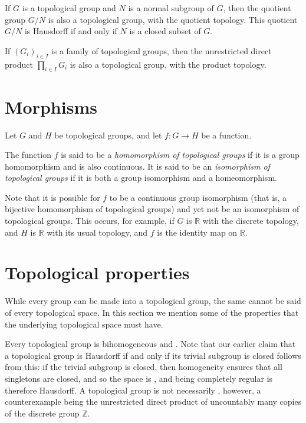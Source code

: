 \documentclass[12pt]{article}
\def\R{\mathbb{R}}
\def\Z{\mathbb{Z}}
\begin{document}
If $G$ is a topological group and $N$ is a normal subgroup of $G$,
then the quotient group $G/N$ is also a topological group,
with the quotient topology.
This quotient $G/N$ is Hausdorff if and only if $N$ is a closed subset of $G$.

If $(G_i)_{i\in I}$ is a family of topological groups,
then the unrestricted direct product $\prod_{i\in I}G_i$
is also a topological group, with the product topology.

\section*{Morphisms}

Let $G$ and $H$ be topological groups, and let $f\colon G\to H$ be a function.

The function $f$ is said to be a \emph{homomorphism of topological groups}
if it is a group homomorphism and is also continuous.
It is said to be an \emph{isomorphism of topological groups}
if it is both a group isomorphism and a homeomorphism.

Note that it is possible for $f$ to be a continuous group isomorphism
(that is, a bijective homomorphism of topological groups)
and yet not be an isomorphism of topological groups.
This occurs, for example, if $G$ is $\R$ with the discrete topology,
and $H$ is $\R$ with its usual topology,
and $f$ is the identity map on $\R$.

\section*{Topological properties}

While every group can be made into a topological group,
the same cannot be said of every topological space.
In this section we mention some of the properties
that the underlying topological space must have.

Every topological group is bihomogeneous
and .
Note that our earlier claim that a topological group
is Hausdorff if and only if its trivial subgroup is closed
follows from this:
if the trivial subgroup is closed,
then homogeneity ensures that all singletons are closed,
and so the space is ,
and being completely regular is therefore Hausdorff.
A topological group is not necessarily , however,
a counterexample being the unrestricted direct product
of uncountably many copies of the discrete group $\Z$.
\end{document}
